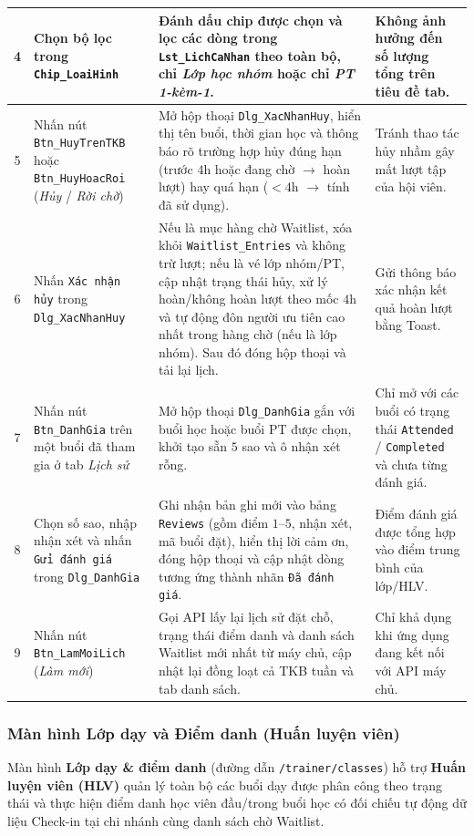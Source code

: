 \documentclass[a4paper,12pt]{article}
\begin{document}
{\begin{longtable}{|c|L{3.5cm}|L{7.8cm}|L{3.5cm}|}
4 & Chọn bộ lọc trong \texttt{Chip\_LoaiHinh} &
Đánh dấu chip được chọn và lọc các dòng trong \texttt{Lst\_LichCaNhan} theo toàn bộ, chỉ \textit{Lớp học nhóm} hoặc chỉ \textit{PT 1-kèm-1}. &
Không ảnh hưởng đến số lượng tổng trên tiêu đề tab. \\ \hline

5 & Nhấn nút \texttt{Btn\_HuyTrenTKB} hoặc \texttt{Btn\_HuyHoacRoi} (\textit{Hủy} / \textit{Rời chờ}) &
Mở hộp thoại \texttt{Dlg\_XacNhanHuy}, hiển thị tên buổi, thời gian học và thông báo rõ trường hợp hủy đúng hạn (trước $4\text{h}$ hoặc đang chờ $\rightarrow$ hoàn lượt) hay quá hạn ($< 4\text{h}$ $\rightarrow$ tính đã sử dụng). &
Tránh thao tác hủy nhầm gây mất lượt tập của hội viên. \\ \hline

6 & Nhấn \texttt{Xác nhận hủy} trong \texttt{Dlg\_XacNhanHuy} &
Nếu là mục hàng chờ Waitlist, xóa khỏi \texttt{Waitlist\_Entries} và không trừ lượt; nếu là vé lớp nhóm/PT, cập nhật trạng thái hủy, xử lý hoàn/không hoàn lượt theo mốc $4\text{h}$ và tự động đôn người ưu tiên cao nhất trong hàng chờ (nếu là lớp nhóm). Sau đó đóng hộp thoại và tải lại lịch. &
Gửi thông báo xác nhận kết quả hoàn lượt bằng Toast. \\ \hline

7 & Nhấn nút \texttt{Btn\_DanhGia} trên một buổi đã tham gia ở tab \textit{Lịch sử} &
Mở hộp thoại \texttt{Dlg\_DanhGia} gắn với buổi học hoặc buổi PT được chọn, khởi tạo sẵn $5$ sao và ô nhận xét rỗng. &
Chỉ mở với các buổi có trạng thái \texttt{Attended} / \texttt{Completed} và chưa từng đánh giá. \\ \hline

8 & Chọn số sao, nhập nhận xét và nhấn \texttt{Gửi đánh giá} trong \texttt{Dlg\_DanhGia} &
Ghi nhận bản ghi mới vào bảng \texttt{Reviews} (gồm điểm $1$--$5$, nhận xét, mã buổi đặt), hiển thị lời cảm ơn, đóng hộp thoại và cập nhật dòng tương ứng thành nhãn \texttt{Đã đánh giá}. &
Điểm đánh giá được tổng hợp vào điểm trung bình của lớp/HLV. \\ \hline

9 & Nhấn nút \texttt{Btn\_LamMoiLich} (\textit{Làm mới}) &
Gọi API lấy lại lịch sử đặt chỗ, trạng thái điểm danh và danh sách Waitlist mới nhất từ máy chủ, cập nhật lại đồng loạt cả TKB tuần và tab danh sách. &
Chỉ khả dụng khi ứng dụng đang kết nối với API máy chủ. \\ \hline

\end{longtable}
}


\subsubsection{Màn hình Lớp dạy và Điểm danh (Huấn luyện viên)}
Màn hình \textbf{Lớp dạy \& điểm danh} (đường dẫn \texttt{/trainer/classes}) hỗ trợ \textbf{Huấn luyện viên (HLV)} quản lý toàn bộ các buổi dạy được phân công theo trạng thái và thực hiện điểm danh học viên đầu/trong buổi học có đối chiếu tự động dữ liệu Check-in tại chi nhánh cùng danh sách chờ Waitlist.
\end{document}
